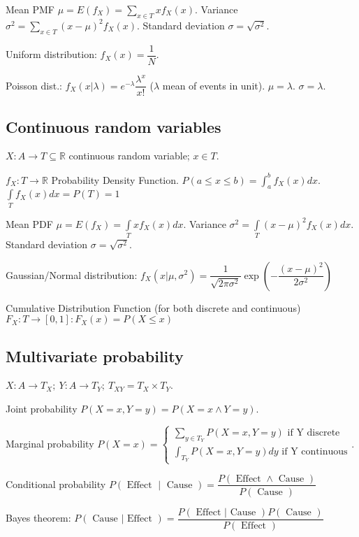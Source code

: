 \documentclass[]{article}
\begin{document}
	Mean PMF $\mu=E(f_X)=\sum\limits_{x \in T}x f_X(x)$.
	Variance $\sigma^2 = \sum\limits_{x \in T} (x-\mu)^2 f_X(x)$.
	Standard deviation $\sigma=\sqrt{\sigma^2}$.
	
	Uniform distribution: $f_X(x)=\dfrac{1}{N}$.
	
	Poisson dist.: $f_X(x|\lambda)=e^{-\lambda}\dfrac{\lambda^x}{x!}$ ($\lambda$ mean of events in unit).
	$\mu=\lambda$. $\sigma=\lambda$.
	
	\subsection{Continuous random variables}
	
	$X:A\to T\subseteq\mathbb{R}$ continuous random variable; $x\in T$.
	
	$f_X:T\to\mathbb{R}$ Probability Density Function.
	$P(a\le x\le b) = \int_{a}^{b}f_X(x)dx$.
	$\int\limits_T f_X(x) dx = P(T) = 1$
	
	Mean PDF $\mu = E(f_X) = \int\limits_T x f_X(x) dx$.
	Variance $\sigma^2 = \int\limits_T (x-\mu)^2 f_X(x)dx$.
	Standard deviation $\sigma=\sqrt{\sigma^2}$.
	
	Gaussian/Normal distribution: $f_X(x|\mu,\sigma^2)=\dfrac{1}{\sqrt{2\pi\sigma^2}}\exp\left(-\dfrac{(x-\mu)^2}{2\sigma^2}\right)$
	
	Cumulative Distribution Function (for both discrete and continuous) $F_X:T\to[0,1]: F_X(x) = P(X\le x)$
	
	\subsection{Multivariate probability}
	
	$X:A\to T_X; \ Y:A\to T_Y; \ T_{XY}=T_X \times T_Y$.
	
	Joint probability $P(X=x,Y=y) = P(X=x \land Y=y)$.
	
	Marginal probability $P(X=x)=\left\{\begin{matrix}
		\sum_{y\in T_Y} P(X=x,Y=y) \text{ if Y discrete}\\
		\int_{T_Y} P(X=x,Y=y) dy \text{ if Y continuous}
	\end{matrix}\right.$.
	
	Conditional probability $P(\text { Effect } \mid \text { Cause })=\dfrac{P(\text { Effect } \wedge \text { Cause })}{P(\text { Cause })}$
	
	Bayes theorem: $P(\text { Cause } | \text { Effect })=\dfrac{P(\text { Effect } | \text { Cause }) P( \text{ Cause })}{P(\text { Effect })}$
	
\end{document}
